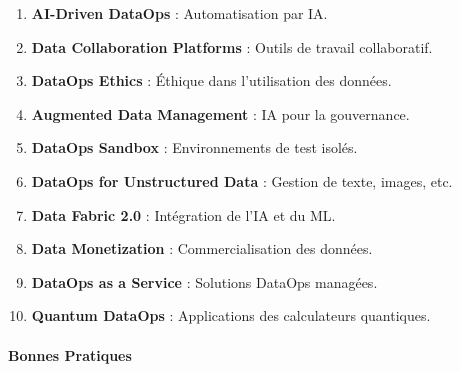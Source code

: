\documentclass[
  letterpaper,
  DIV=11,
  numbers=noendperiod]{scrartcl}
\makeatletter
\let\oldparagraph\paragraph
\renewcommand{\paragraph}{
    \@ifstar
      \xxxParagraphStar
      \xxxParagraphNoStar
  }
\newcommand{\xxxParagraphStar}[1]{\oldparagraph*{#1}\mbox{}}
\newcommand{\xxxParagraphNoStar}[1]{\oldparagraph{#1}\mbox{}}
\providecommand{\tightlist}{%
  \setlength{\itemsep}{0pt}\setlength{\parskip}{0pt}}\usepackage{longtable,booktabs,array}
\makeatother
\begin{document}
\begin{enumerate}
\def\labelenumi{\arabic{enumi}.}
\setcounter{enumi}{80}
\tightlist
\item
  \textbf{AI-Driven DataOps} : Automatisation par IA.\\
\item
  \textbf{Data Collaboration Platforms} : Outils de travail
  collaboratif.\\
\item
  \textbf{DataOps Ethics} : Éthique dans l'utilisation des données.\\
\item
  \textbf{Augmented Data Management} : IA pour la gouvernance.\\
\item
  \textbf{DataOps Sandbox} : Environnements de test isolés.\\
\item
  \textbf{DataOps for Unstructured Data} : Gestion de texte, images,
  etc.\\
\item
  \textbf{Data Fabric 2.0} : Intégration de l'IA et du ML.\\
\item
  \textbf{Data Monetization} : Commercialisation des données.\\
\item
  \textbf{DataOps as a Service} : Solutions DataOps managées.\\
\item
  \textbf{Quantum DataOps} : Applications des calculateurs quantiques.
\end{enumerate}

\paragraph{\texorpdfstring{\textbf{Bonnes
Pratiques}}{Bonnes Pratiques}}\label{bonnes-pratiques-1}
\end{document}
